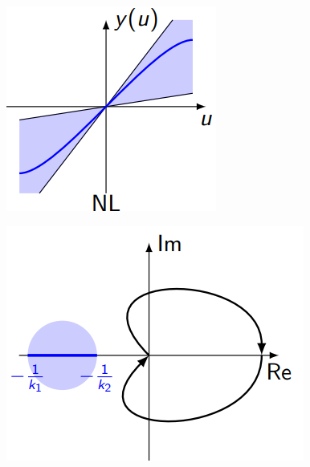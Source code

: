 \begin{minipage}{0.49\linewidth}
    \includegraphics[width = \linewidth]{src/images/nolinearity_plot.png}
\end{minipage}
\begin{minipage}{0.49\linewidth}
    \includegraphics[width = \linewidth]{src/images/nolinearity_nyquist.png}
\end{minipage}

